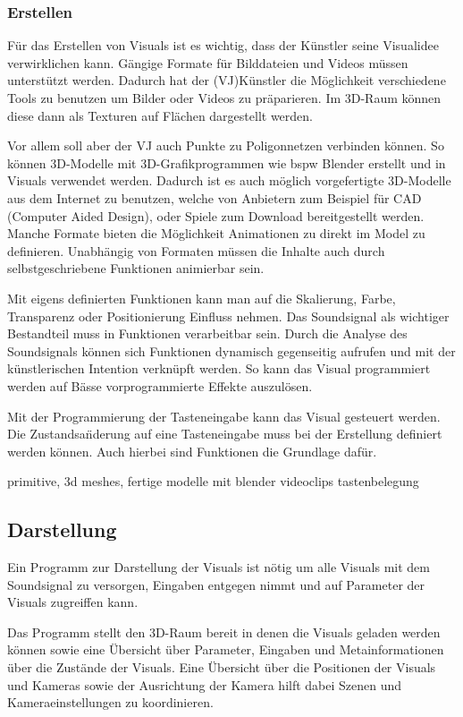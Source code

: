 \subsubsection{Erstellen}

F\"ur das Erstellen von Visuals ist es wichtig, dass der K\"unstler seine Visualidee verwirklichen kann. G\"angige
Formate f\"ur Bilddateien und Videos m\"ussen unterst\"utzt werden. Dadurch hat der (VJ)K\"unstler die M\"oglichkeit
verschiedene Tools zu benutzen um Bilder oder Videos zu pr\"aparieren. Im 3D-Raum k\"onnen diese dann als Texturen auf
Fl\"achen dargestellt werden.

Vor allem soll aber der VJ auch Punkte zu Poligonnetzen verbinden k\"onnen. So k\"onnen 3D-Modelle mit 3D-Grafikprogrammen
wie bspw Blender erstellt und in Visuals verwendet werden. Dadurch ist es auch m\"oglich vorgefertigte 3D-Modelle aus dem
Internet zu benutzen, welche von Anbietern zum Beispiel f\"ur CAD (Computer Aided Design), oder Spiele zum Download bereitgestellt
werden. Manche Formate bieten die M\"oglichkeit Animationen zu direkt im Model zu definieren. Unabh\"angig von Formaten
m\"ussen die Inhalte auch durch selbstgeschriebene Funktionen animierbar sein.

Mit eigens definierten Funktionen kann man auf die Skalierung, Farbe, Transparenz oder Positionierung Einfluss nehmen.
Das Soundsignal als wichtiger Bestandteil muss in Funktionen verarbeitbar sein. Durch die Analyse des Soundsignals k\"onnen
sich Funktionen dynamisch gegenseitig aufrufen und mit der k\"unstlerischen Intention verkn\"upft werden. So kann das
Visual programmiert werden auf B\"asse vorprogrammierte Effekte auszul\"osen.

Mit der Programmierung der Tasteneingabe kann das Visual gesteuert werden. Die Zustandsa\"nderung auf eine Tasteneingabe
muss bei der Erstellung definiert werden k\"onnen. Auch hierbei sind Funktionen die Grundlage daf\"ur.

primitive, 3d meshes,
fertige modelle mit blender
videoclips
tastenbelegung


\subsection{Darstellung}

Ein Programm zur Darstellung der Visuals ist n\"otig um alle Visuals mit dem Soundsignal zu versorgen, Eingaben entgegen
nimmt und auf Parameter der Visuals zugreiffen kann.


Das Programm stellt den 3D-Raum bereit in denen die Visuals geladen werden k\"onnen sowie eine \"Ubersicht \"uber
Parameter, Eingaben und Metainformationen \"uber die Zust\"ande der Visuals. Eine \"Ubersicht \"uber die Positionen
der Visuals und Kameras sowie der Ausrichtung der Kamera hilft dabei Szenen und Kameraeinstellungen zu koordinieren.


